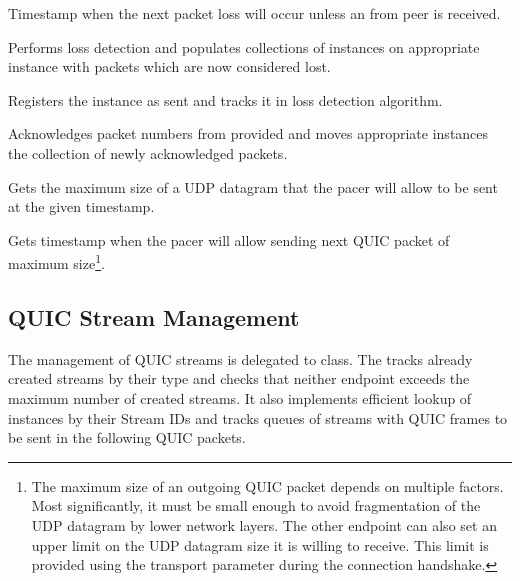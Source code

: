 \begin{description}

       Timestamp when the next packet
loss will occur unless an \ACK{} from peer is received.

       Performs loss detection and populates
collections of \SentPacket{} instances on appropriate \PacketNumberSpace{} instance with packets
which are now considered lost.

Registers the \SentPacket{} instance as sent and tracks it in loss detection algorithm.

       Acknowledges packet numbers from provided \RangeSet{} and moves appropriate
\SentPacket{} instances the collection of newly acknowledged packets.

       Gets the maximum size of a
UDP datagram that the pacer will allow to be sent at the given timestamp.

         Gets timestamp when the
pacer will allow sending next QUIC packet of maximum size\footnote{The maximum size of an outgoing
QUIC packet depends on multiple factors. Most significantly, it must be small enough to avoid
fragmentation of the UDP datagram by lower network layers. The other endpoint can also set an upper
limit on the UDP datagram size it is willing to receive. This limit is provided using the
\MaxUdpPayloadSize{} transport parameter during the connection handshake.}.

\end{description}

\subsection{QUIC Stream Management}

The management of QUIC streams is delegated to \StreamCollection{} class. The \StreamCollection{}
tracks already created streams by their type and checks that neither endpoint exceeds the maximum
number of created streams. It also implements efficient lookup of \ManagedQuicStream{} instances by
their Stream IDs and tracks queues of streams with QUIC frames to be sent in the following QUIC
packets.

